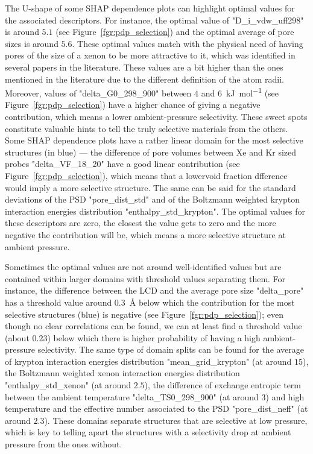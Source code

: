 \documentclass[main]{subfiles}
\begin{document}
The U-shape of some SHAP dependence plots can highlight optimal values for the associated descriptors. For instance, the optimal value of "D\_i\_vdw\_uff298" is around $5.1$ (see Figure~\ref{fgr:pdp_selection}) and the optimal average of pore sizes is around $5.6$. These optimal values match with the physical need of having pores of the size of a xenon to be more attractive to it, which was identified in several papers in the literature. These values are a bit higher than the ones mentioned in the literature due to the different definition of the atom radii.\autocite{Hung_2021} Moreover, values of "delta\_G0\_298\_900" between $4$ and \SI{6}{\kilo\joule\per\mole} (see Figure~\ref{fgr:pdp_selection}) have a higher chance of giving a negative contribution, which means a lower ambient-pressure selectivity. These sweet spots constitute valuable hints to tell the truly selective materials from the others. Some SHAP dependence plots have a rather linear domain for the most selective structures (in blue) --- the difference of pore volumes between Xe and Kr sized probes "delta\_VF\_18\_20" have a good linear contribution (see Figure~\ref{fgr:pdp_selection}), which means that a lowervoid fraction dfference would imply a more selective structure. The same can be said for the standard deviations of the PSD "pore\_dist\_std" and of the Boltzmann weighted krypton interaction energies distribution "enthalpy\_std\_krypton". The optimal values for these descriptors are zero, the closest the value gets to zero and the more negative the contribution will be, which means a more selective structure at ambient pressure.

Sometimes the optimal values are not around well-identified values but are contained within larger domains with threshold values separating them. For instance, the difference between the LCD and the average pore size "delta\_pore" has a threshold value around \SI{0.3}{\angstrom} below which the contribution for the most selective structures (blue) is negative (see Figure~\ref{fgr:pdp_selection}); even though no clear correlations can be found, we can at least find a threshold value (about $0.23$) below which there is higher probability of having a high ambient-pressure selectivity. The same type of domain splits can be found for the average of krypton interaction energies distribution "mean\_grid\_krypton" (at around $15$), the Boltzmann weighted xenon interaction energies distribution "enthalpy\_std\_xenon" (at around $2.5$), the difference of exchange entropic term between the ambient temperature "delta\_TS0\_298\_900" (at around $3$) and high temperature and the effective number associated to the PSD "pore\_dist\_neff" (at around $2.3$). These domains separate structures that are selective at low pressure, which is key to telling apart the structures with a selectivity drop at ambient pressure from the ones without.
\end{document}
